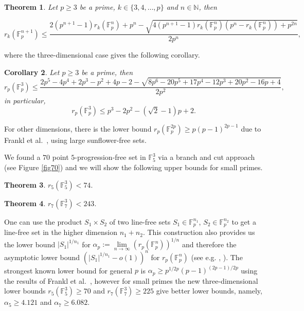 \documentclass[12pt]{amsart}
\newcommand{\<}{\langle}
\renewcommand{\>}{\rangle}
\newtheorem{theorem}{Theorem}
\newtheorem{corollary}[theorem]{Corollary}
\numberwithin{equation}{section}
\numberwithin{theorem}{section}
\begin{document}
\begin{theorem}
\label{ubmain}
Let $p\geq 3$ be a prime, $k\in \{3,4,\dots,p\}$ and $n\in \mathbb{N}$, then

$${r_k(\mathbb{F}_p^{n+1})}\leq \frac{2(p^
{n+1}-1)r_k(\mathbb{F}_p^n)+p^n-\sqrt{4(p^
{n+1}-1)r_k(\mathbb{F}_p^n)(p^n-r_k(\mathbb{F}_p^n))+p^{2n}}}{2p^n},$$
\end{theorem}

where the three-dimensional case gives the following corollary.

\begin{corollary}\label{cor-upp}
Let $p\geq 3$ be a prime, then $$r_p(\mathbb{F}_p^3) \leq\frac{2p^5-4p^4+2p^3-p^2+4p-2-\sqrt{8p^6-20p^5+17p^4-12p^3+20p^2-16p+4}}{2p^2},$$
in particular,
$$r_p(\mathbb{F}_p^3)\leq p^3-2p^2-(\sqrt{2}-1)p+2.$$

\end{corollary}


For other dimensions, there is the lower bound $r_p(\mathbb{F}_p^{2p})\geq p(p-1)^{2p-1}$ due to Frankl et al.~\cite{FGR}, using large sunflower-free sets.

We found a $70$ point $5$-progression-free set in $\mathbb{F}_5^3$ via a branch and cut approach (see Figure \ref{fig70}) and we will show the following upper bounds for small primes.




\begin{theorem}\label{thm-r5}
$r_5(\mathbb{F}_5^3)<74.$
\end{theorem}

\begin{theorem}\label{thm-r7}
$r_7(\mathbb{F}_7^3)<243. $
\end{theorem}

One can use the product $S_1\times S_2$ of two line-free sets $S_1\in \mathbb{F}_p^{n_1}$, $S_2\in \mathbb{F}_p^{n_2}$ to get a line-free set in the higher dimension $n_1+n_2$. This construction also provides us the lower bound $|S_1|^{1/{n_1}}$ for $\alpha_p:=\lim\limits_{n \rightarrow \infty}(r_p(\mathbb{F}_p^n))^{1/n}$ and therefore the asymptotic lower bound $(|S_1|^{1/{n_1}}-o(1))^n$ for $r_p(\mathbb{F}_p^n)$ (see e.g. \cite{SET}, \cite{Pach22}).
The strongest known lower bound for general $p$ is  $\alpha_p\geq p^{1/{2p}}(p-1)^{(2p-1)/{2p}}$ using the results of Frankl et al.~\cite{FGR}, however for small primes the new three-dimensional lower bounds $r_5(\mathbb{F}_5^3)\geq 70$ and  $r_7(\mathbb{F}_7^3)\geq 225$ give better lower bounds, namely, $\alpha_5\geq 4.121$  and $\alpha_7\geq 6.082$.
\end{document}
